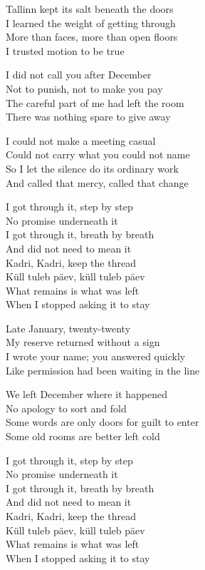 \begin{lyrics}
Tallinn kept its salt beneath the doors\\
I learned the weight of getting through\\
More than faces, more than open floors\\
I trusted motion to be true

I did not call you after December\\
Not to punish, not to make you pay\\
The careful part of me had left the room\\
There was nothing spare to give away

I could not make a meeting casual\\
Could not carry what you could not name\\
So I let the silence do its ordinary work\\
And called that mercy, called that change

I got through it, step by step\\
No promise underneath it\\
I got through it, breath by breath\\
And did not need to mean it\\
Kadri, Kadri, keep the thread\\
Küll tuleb päev, küll tuleb päev\\
What remains is what was left\\
When I stopped asking it to stay

Late January, twenty-twenty\\
My reserve returned without a sign\\
I wrote your name; you answered quickly\\
Like permission had been waiting in the line

We left December where it happened\\
No apology to sort and fold\\
Some words are only doors for guilt to enter\\
Some old rooms are better left cold

I got through it, step by step\\
No promise underneath it\\
I got through it, breath by breath\\
And did not need to mean it\\
Kadri, Kadri, keep the thread\\
Küll tuleb päev, küll tuleb päev\\
What remains is what was left\\
When I stopped asking it to stay


\end{lyrics}
